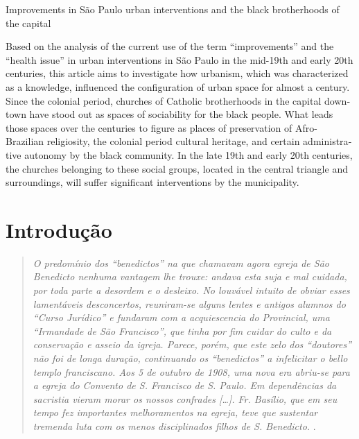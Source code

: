 \begin{refsection}
\begin{otherlanguage}{english}
    \fakeChapterTwoLines
    {Improvements in São Paulo}
    {urban interventions and the black brotherhoods of the capital}

    \begin{galoResumo}[Abstract]
        Based on the analysis of the current use of the term ``improvements'' and the ``health issue'' in urban interventions in São Paulo in the mid-19th and early 20th centuries, this article aims to investigate how urbanism, which was characterized as a knowledge, influenced the configuration of urban space for almost a century. Since the colonial period, churches of Catholic brotherhoods in the capital downtown have stood out as spaces of sociability for the black people. What leads those spaces over the centuries to figure as places of preservation of Afro-Brazilian religiosity, the colonial period cultural heritage, and certain administrative autonomy by the black community. In the late 19th and early 20th centuries, the churches belonging to these social groups, located in the central triangle and surroundings, will suffer significant interventions by the municipality.
    \end{galoResumo}
    
    \end{otherlanguage}

    \section{Introdução}

    \begin{quotation}
        \textit{O predomínio dos ``benedictos'' na que chamavam agora egreja de São Benedicto nenhuma vantagem lhe trouxe: andava esta suja e mal cuidada, por toda parte a desordem e o desleixo. No louvável intuito de obviar esses lamentáveis desconcertos, reuniram-se alguns lentes e antigos alumnos do ``Curso Jurídico'' e fundaram com a acquiescencia do Provincial, uma ``Irmandade de São Francisco'', que tinha por fim cuidar do culto e da conservação e asseio da igreja. Parece, porém, que este zelo dos ``doutores'' não foi de longa duração, continuando os ``benedictos'' a infelicitar o bello templo franciscano. Aos 5 de outubro de 1908, uma nova era abriu-se para a egreja do Convento de S. Francisco de S. Paulo. Em dependências da sacristia vieram morar os nossos confrades [\dots]. Fr. Basílio, que em seu tempo fez importantes melhoramentos na egreja, teve que sustentar tremenda luta com os menos disciplinados filhos de S. Benedicto.} \cite[p.~82]{Rower1922Provincia}.
    \end{quotation}


\end{refsection}
